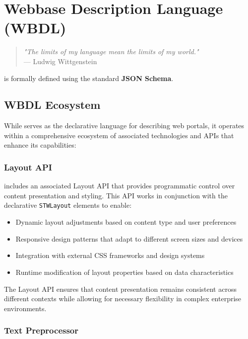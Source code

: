 
\chapter{Webbase Description Language (WBDL)}
\label{chap:wbdl}

\begin{quote}
\textit{"The limits of my language mean the limits of my world."} \\
— Ludwig Wittgenstein
\end{quote}

\wbdl{} is formally defined using the standard \textbf{JSON Schema}.

\section{WBDL Ecosystem}
\label{sec:wbdl-ecosystem}

While \wbdl{} serves as the declarative language for describing web portals, it operates within a comprehensive ecosystem of associated technologies and APIs that enhance its capabilities:

\subsection{Layout API}
\label{sec:layout-api}

\wbdl{} includes an associated Layout API that provides programmatic control over content presentation and styling. This API works in conjunction with the declarative \texttt{STWLayout} elements to enable:

\begin{itemize}
\item Dynamic layout adjustments based on content type and user preferences
\item Responsive design patterns that adapt to different screen sizes and devices
\item Integration with external CSS frameworks and design systems
\item Runtime modification of layout properties based on data characteristics
\end{itemize}

The Layout API ensures that content presentation remains consistent across different contexts while allowing for necessary flexibility in complex enterprise environments.

\subsection{Text Preprocessor}
\label{sec:text-preprocessor}

